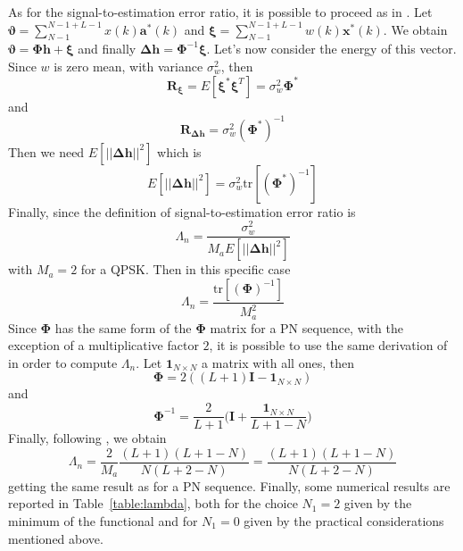 \documentclass[10pt]{article}
\begin{document}
As for the signal-to-estimation error ratio, it is possible to proceed as in \cite{bc}. Let $\boldsymbol{\vartheta} = \sum_{N-1}^{N-1+L-1} x(k) \mathbf{a}^*(k)$ and $\boldsymbol{\xi} = \sum_{N-1}^{N-1+L-1} w(k) \mathbf{x}^*(k)$. We obtain $\boldsymbol{\vartheta} = \boldsymbol{\Phi}\mathbf{h} + \boldsymbol{\xi}$ and finally $\boldsymbol{\Delta h} = \boldsymbol{\Phi}^{-1} \boldsymbol{\xi}$. 
Let's now consider the energy of this vector. Since $w$ is zero mean, with variance $\sigma_w^2$, then
\begin{equation}
	\mathbf{R}_{\boldsymbol{\xi}} = E[\boldsymbol{\xi}^*\boldsymbol{\xi}^T] = \sigma_w^2 \mathbf{\Phi}^*
\end{equation}
and
\begin{equation}
	\mathbf{R}_{\boldsymbol{\Delta h}} = \sigma_w^2 (\mathbf{\Phi}^*)^{-1}
\end{equation}
Then we need $E[||\mathbf{\Delta h}||^2]$ which is
\begin{equation}
	E[||\mathbf{\Delta h}||^2] = \sigma_w^2 \mbox{tr}[(\mathbf{\Phi}^*)^{-1}]
\end{equation}
Finally, since the definition of signal-to-estimation error ratio is 
\begin{equation}
	\Lambda_n = \frac{\sigma_w^2}{M_a E[||\mathbf{\Delta h}||^2]}
\end{equation}
with $M_a = 2$ for a QPSK. Then in this specific case
\begin{equation}
	\Lambda_n = \frac{\mbox{tr}[(\mathbf{\Phi})^{-1}]}{M_a^2}
\end{equation}
Since $\mathbf{\Phi}$ has the same form of the $\mathbf{\Phi}$ matrix for a PN sequence, with the exception of a multiplicative factor $2$, it is possible to use the same derivation of \cite{bc} in order to compute $\Lambda_n$. Let $\mathbf{1}_{N\times N}$ a matrix with all ones, then
\begin{equation}
	\mathbf{\Phi} = 2 ((L+1)\mathbf{I} - \mathbf{1}_{N\times N})
\end{equation}
and
\begin{equation}
	\mathbf{\Phi}^{-1} = \frac{2}{L+1} \bigg( \mathbf{I} + \frac{\mathbf{1}_{N\times N}}{L+1-N} \bigg)
\end{equation}
Finally, following \cite{bc}, we obtain
\begin{equation}
	\Lambda_n = \frac{2}{M_a}\frac{(L+1)(L+1-N)}{N(L+2-N)} = \frac{(L+1)(L+1-N)}{N(L+2-N)}
	\label{eq:lambdateo}
\end{equation}
getting the same result as for a PN sequence.
Finally, some numerical results are reported in Table~\ref{table:lambda}, both for the choice $N_1 = 2$ given by the minimum of the functional and for $N_1 = 0$ given by the practical considerations mentioned above. 
\end{document}
